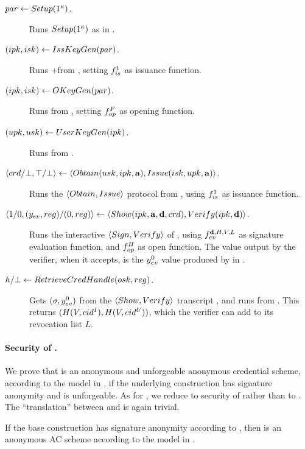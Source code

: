 \begin{description}
\item[$par \gets Setup(1^\kappa)$.] Runs $Setup(1^\kappa)$ as in
  \CUASGenInt.
\item[$(ipk,isk) \gets IssKeyGen(par)$.] Runs \KeyGen+\ISet from
  \CUASGenInt, setting $f_{is}^1$ as issuance function.
\item[$(ipk,isk) \gets OKeyGen(par)$.] Runs \OKeyGen from \CUASGenInt,
  setting $f_{op}^F$ as opening function.
\item[$(upk,usk) \gets UserKeyGen(ipk)$.] Runs \KeyGen from \CUASGenInt.
\item[$\langle crd/\bot,\top/\bot \rangle \gets
  \langle Obtain(usk,ipk,\mathbf{a}),Issue(isk,upk,\mathbf{a}) \rangle$.]
  Runs the $\langle Obtain,Issue \rangle$ protocol from \CUASGenInt, using
  $f_{is}^1$ as issuance function.
\item[$\langle 1/0,(y_{ev},reg)/(0,reg)\rangle \gets \langle Show(ipk,
  \mathbf{a},\mathbf{d},crd),
  Verify(ipk,\mathbf{d}) \rangle$.]
  Runs the interactive $\langle Sign,Verify\rangle$ of \CUASGenInt,
  using $f_{ev}^{\mathbf{d},H,V,L}$ as signature evaluation function, and
  $f_{op}^H$ as open function. The \yeval value output by the verifier, when
  it accepts, is the $y_{ev}^0$ value produced by \Sign in \CUASGenInt.
\item[$h/\bot \gets RetrieveCredHandle(osk,reg)$.]
  Gets $(\sigma,y_{ev}^0)$ from the $\langle Show,Verify\rangle$ transcript
  \utrans, and runs \Open from \CUASGenInt. This returns $(H(V,cid^I),
  H(V,cid^U))$, which the verifier can add to its revocation list $L$.
\end{description}

\paragraph{Security of \CUASRAC.} %
We prove that \CUASRAC is an anonymous and unforgeable anonymous credential
scheme, according to the model in , if the underlying
\CUASGen construction has signature anonymity and is unforgeable.
%
As for \CUASAC, we reduce to security of \CUASGen rather than to
\CUASGenInt. The ``translation'' between \CUASGen and \CUASGenInt is
again trivial.

\begin{theorem}
  \label{thm:anon-cuasrac}
  If the base \CUASGen construction has signature anonymity according to
  , then \CUASAC is an anonymous AC scheme
  according to the model in .
\end{theorem}

